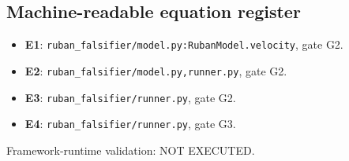 \subsection*{Machine-readable equation register}
\begin{itemize}
\item \textbf{E1}: \texttt{ruban\_falsifier/model.py:RubanModel.velocity}, gate G2.
\item \textbf{E2}: \texttt{ruban\_falsifier/model.py,runner.py}, gate G2.
\item \textbf{E3}: \texttt{ruban\_falsifier/runner.py}, gate G2.
\item \textbf{E4}: \texttt{ruban\_falsifier/runner.py}, gate G3.
\end{itemize}\noindent Framework-runtime validation: NOT EXECUTED.
